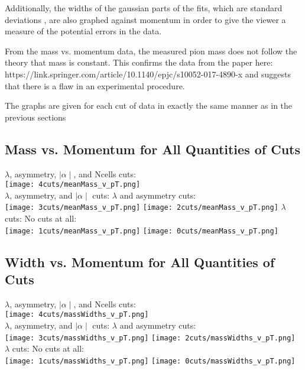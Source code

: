 \documentclass[11pt]{article}
\begin{document}
Additionally, the widths of the gaussian parts of the fits, which are standard deviations , are also graphed against momentum in order to give the viewer a measure of the potential errors in the data.

From the mass vs. momentum data, the measured pion mass does not follow the theory that mass is constant. This confirms the data from the paper here: https://link.springer.com/article/10.1140/epjc/s10052-017-4890-x and suggests that there is a flaw in an experimental procedure.

The graphs are given for each cut of data in exactly the same manner as in the previous sections 

\subsection{Mass vs. Momentum for All Quantities of Cuts}%
\begin{frame}{}
$\lambda$, asymmetry, $\mid\alpha\mid$, and Ncells cuts:\\
\texttt{[image: 4cuts/meanMass\_v\_pT.png]}\\
$\lambda$, asymmetry, and $\mid\alpha\mid$ cuts:
\noindent\hspace{3 cm}$\lambda$ and asymmetry cuts:\\
\texttt{[image: 3cuts/meanMass\_v\_pT.png]}
\texttt{[image: 2cuts/meanMass\_v\_pT.png]}
$\lambda$ cuts:
\noindent\hspace{4 cm} No cuts at all:\\
\texttt{[image: 1cuts/meanMass\_v\_pT.png]}
\texttt{[image: 0cuts/meanMass\_v\_pT.png]}
\end{frame}

\subsection{Width vs. Momentum for All Quantities of Cuts}%
\begin{frame}{}
$\lambda$, asymmetry, $\mid\alpha\mid$, and Ncells cuts:\\
\texttt{[image: 4cuts/massWidths\_v\_pT.png]}\\
$\lambda$, asymmetry, and $\mid\alpha\mid$ cuts:
\noindent\hspace{3 cm}$\lambda$ and asymmetry cuts:\\
\texttt{[image: 3cuts/massWidths\_v\_pT.png]}
\texttt{[image: 2cuts/massWidths\_v\_pT.png]}
$\lambda$ cuts:
\noindent\hspace{4 cm} No cuts at all:\\
\texttt{[image: 1cuts/massWidths\_v\_pT.png]}
\texttt{[image: 0cuts/massWidths\_v\_pT.png]}
\end{frame}
\end{document}
